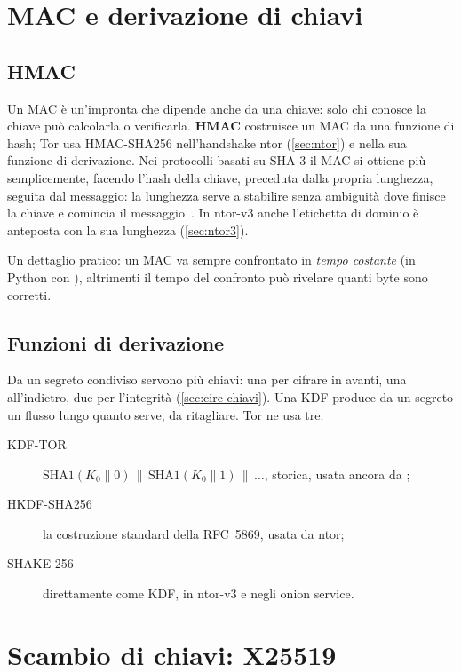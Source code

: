 \section{MAC e derivazione di chiavi}\label{sec:cripto-mac}

\subsection{HMAC}

Un MAC è un'impronta che dipende anche da una chiave: solo chi conosce la chiave può calcolarla o verificarla. \textbf{HMAC} costruisce un MAC da una funzione di hash; Tor usa HMAC-SHA256 nell'handshake ntor (\cref{sec:ntor}) e nella sua funzione di derivazione. Nei protocolli basati su SHA-3 il MAC si ottiene più semplicemente, facendo l'hash della chiave, preceduta dalla propria lunghezza, seguita dal messaggio: la lunghezza serve a stabilire senza ambiguità dove finisce la chiave e comincia il messaggio~. In ntor-v3 anche l'etichetta di dominio è anteposta con la sua lunghezza (\cref{sec:ntor3}).

Un dettaglio pratico: un MAC va sempre confrontato in \emph{tempo costante} (in Python con ), altrimenti il tempo del confronto può rivelare quanti byte sono corretti.

\subsection{Funzioni di derivazione}

Da un segreto condiviso servono più chiavi: una per cifrare in avanti, una all'indietro, due per l'integrità (\cref{sec:circ-chiavi}). Una KDF produce da un segreto un flusso lungo quanto serve, da ritagliare. Tor ne usa tre:
\begin{description}
  \item[KDF-TOR] $\mathrm{SHA1}(K_0 \| 0) \,\|\, \mathrm{SHA1}(K_0 \| 1) \,\|\, \ldots$, storica, usata ancora da ;
  \item[HKDF-SHA256] la costruzione standard della RFC~5869, usata da ntor;
  \item[SHAKE-256] direttamente come KDF, in ntor-v3 e negli onion service.
\end{description}

\section{Scambio di chiavi: X25519}\label{sec:cripto-dh}

